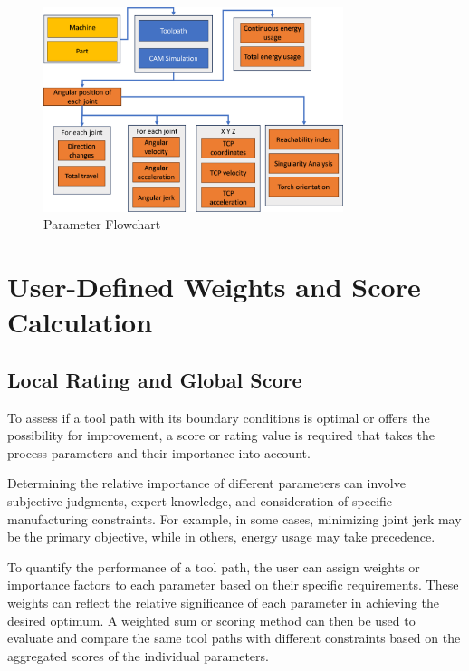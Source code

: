 \begin{figure}[H]
	\centerline{\includegraphics[width=0.781\textwidth]{figures/Flow.png}}
	\caption{Parameter Flowchart}
	\label{ParamsFlow}
\end{figure}

\newpage

\section{User-Defined Weights and Score Calculation}\label{weights}
\subsection{Local Rating and Global Score}
To assess if a tool path with its boundary conditions is optimal or offers the possibility for improvement, a score or rating value is required that takes the process parameters and their importance into account. 

Determining the relative importance of different parameters can involve subjective judgments, expert knowledge, and consideration of specific manufacturing constraints. For example, in some cases, minimizing joint jerk may be the primary objective, while in others, energy usage may take precedence.

To quantify the performance of a tool path, the user can assign weights or importance factors to each parameter based on their specific requirements. These weights can reflect the relative significance of each parameter in achieving the desired optimum. A weighted sum or scoring method can then be used to evaluate and compare the same tool paths with different constraints based on the aggregated scores of the individual parameters. %

